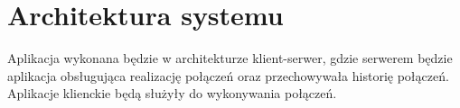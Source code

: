 \section{Architektura systemu}

Aplikacja wykonana będzie w architekturze klient-serwer, gdzie serwerem będzie aplikacja obsługująca realizację
połączeń oraz przechowywała historię połączeń.
Aplikacje klienckie będą służyły do wykonywania połączeń.